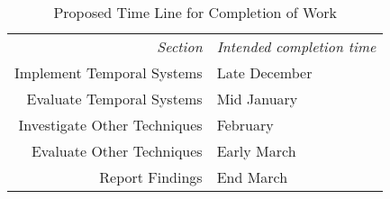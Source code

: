 \begin{table}[H]\label{table:time-allocation}
\begin{center}
\begin{tabular}{r|l}
    \emph{Section} & \emph{Intended completion time}\\
    Implement Temporal Systems & Late December\\
    Evaluate Temporal Systems & Mid January\\
    Investigate Other Techniques & February\\
    Evaluate Other Techniques & Early March\\
    Report Findings & End March\\
\end{tabular}\par
    \caption{Proposed Time Line for Completion of Work}
\end{center}
\end{table}
